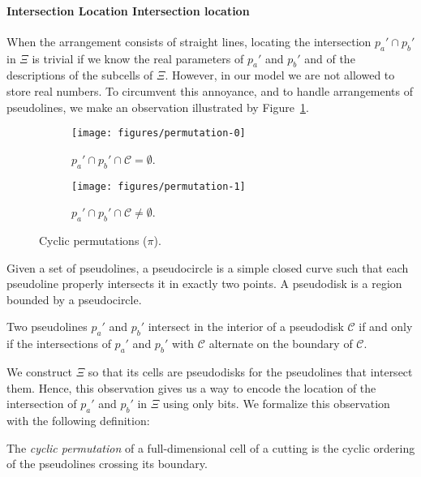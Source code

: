 \paragraph*{\iftitlecase%
Intersection Location\else%
Intersection location\fi} When the arrangement consists of straight lines,
locating the intersection \(p_a' \cap p_b'\) in \(\Xi\) is trivial if we
know the real parameters of \(p_a'\) and \(p_b'\) and of the descriptions
of the subcells of \(\Xi\). However, in our model we are not allowed to store
real numbers. To circumvent this annoyance, and to handle arrangements of
pseudolines, we make an observation illustrated by
Figure~\ref{fig:permutation}.
%
\begin{figure}
\centering{}
\begin{subfigure}[t]{0.5\textwidth}
\centering{}
\texttt{[image: figures/permutation-0]}
\caption{\(p_a' \cap p_b' \cap \mathcal{C} = \emptyset\).}
\end{subfigure}%
\begin{subfigure}[t]{0.5\textwidth}
\centering{}
\texttt{[image: figures/permutation-1]}
\caption{\(p_a' \cap p_b' \cap \mathcal{C} \neq \emptyset\).}
\end{subfigure}
\caption{Cyclic permutations (\(\pi\)).}\label{fig:permutation}
\end{figure}
%
\begin{definition}
    Given a set of pseudolines, a pseudocircle is a simple closed curve such that
    each pseudoline properly intersects it in exactly two points.
    A pseudodisk is a region bounded by a pseudocircle.
\end{definition}
%
\begin{observation}
    Two pseudolines \(p_a'\) and \(p_b'\)
    intersect in the interior of a pseudodisk \(\mathcal{C}\) if and only if
    the intersections of \(p_a'\) and \(p_b'\) with \(\mathcal{C}\)
    alternate on the boundary of \(\mathcal{C}\).
\end{observation}
%
%
We construct \(\Xi\) so that its cells are pseudodisks for the pseudolines that
intersect them.
%
Hence, this observation gives us a way to encode the location of the
intersection of \(p_a'\) and \(p_b'\) in \(\Xi\) using only bits.
%
We formalize this observation with the following definition:
\begin{definition}
  The \emph{cyclic permutation} of a full-dimensional cell of a cutting
  is the cyclic ordering of the pseudolines crossing its boundary.
\end{definition}
